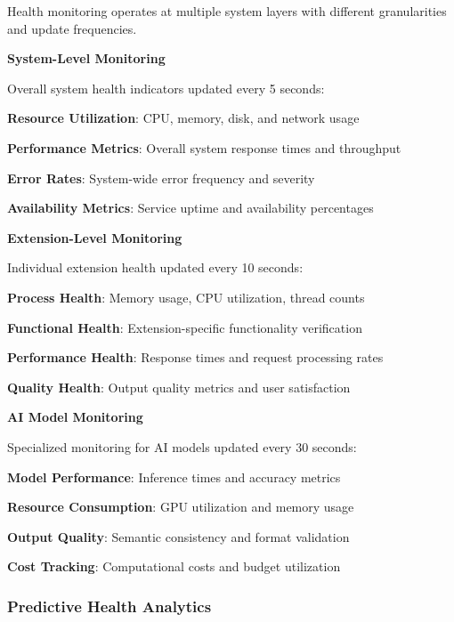 Health monitoring operates at multiple system layers with different granularities and update frequencies.

\textbf{System-Level Monitoring}

Overall system health indicators updated every 5 seconds:

\begin{compactlist}
    \item \textbf{Resource Utilization}: CPU, memory, disk, and network usage
    \item \textbf{Performance Metrics}: Overall system response times and throughput
    \item \textbf{Error Rates}: System-wide error frequency and severity
    \item \textbf{Availability Metrics}: Service uptime and availability percentages
\end{compactlist}

\textbf{Extension-Level Monitoring}

Individual extension health updated every 10 seconds:

\begin{compactlist}
    \item \textbf{Process Health}: Memory usage, CPU utilization, thread counts
    \item \textbf{Functional Health}: Extension-specific functionality verification
    \item \textbf{Performance Health}: Response times and request processing rates
    \item \textbf{Quality Health}: Output quality metrics and user satisfaction
\end{compactlist}

\textbf{AI Model Monitoring}

Specialized monitoring for AI models updated every 30 seconds:

\begin{compactlist}
    \item \textbf{Model Performance}: Inference times and accuracy metrics
    \item \textbf{Resource Consumption}: GPU utilization and memory usage
    \item \textbf{Output Quality}: Semantic consistency and format validation
    \item \textbf{Cost Tracking}: Computational costs and budget utilization
\end{compactlist}

\subsubsection{Predictive Health Analytics}

